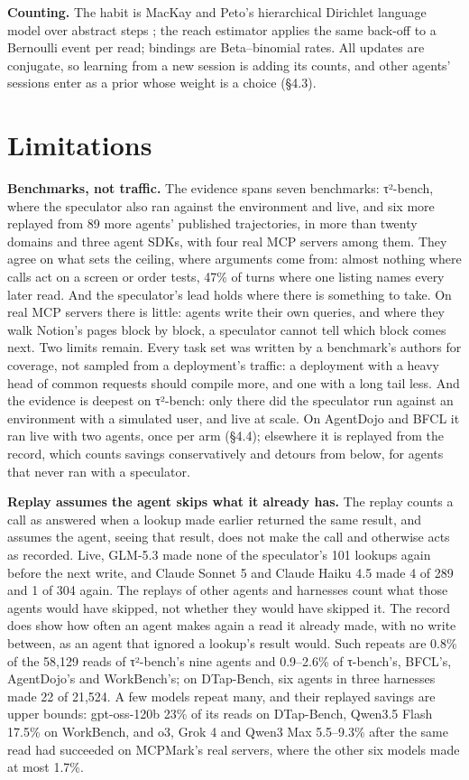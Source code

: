 \documentclass[10pt,twocolumn,letterpaper]{article}
\newcommand{\runin}[1]{{\sffamily\bfseries\color{accent}#1}}
\begin{document}
\runin{Counting.} The habit is MacKay and Peto's hierarchical Dirichlet language model over abstract steps \citep{mackay1995hierarchical}; the reach estimator applies the same back-off to a Bernoulli event per read; bindings are Beta--binomial rates. All updates are conjugate, so learning from a new session is adding its counts, and other agents' sessions enter as a prior whose weight is a choice (§4.3).

\hypertarget{limitations}{%
\section{Limitations}\label{limitations}}

\runin{Benchmarks, not traffic.} The evidence spans seven benchmarks: τ²-bench, where the speculator also ran against the environment and live, and six more replayed from 89 more agents' published trajectories, in more than twenty domains and three agent SDKs, with four real MCP servers among them. They agree on what sets the ceiling, where arguments come from: almost nothing where calls act on a screen or order tests, 47\% of turns where one listing names every later read. And the speculator's lead holds where there is something to take. On real MCP servers there is little: agents write their own queries, and where they walk Notion's pages block by block, a speculator cannot tell which block comes next. Two limits remain. Every task set was written by a benchmark's authors for coverage, not sampled from a deployment's traffic: a deployment with a heavy head of common requests should compile more, and one with a long tail less. And the evidence is deepest on τ²-bench: only there did the speculator run against an environment with a simulated user, and live at scale. On AgentDojo and BFCL it ran live with two agents, once per arm (§4.4); elsewhere it is replayed from the record, which counts savings conservatively and detours from below, for agents that never ran with a speculator.

\runin{Replay assumes the agent skips what it already has.} The replay counts a call as answered when a lookup made earlier returned the same result, and assumes the agent, seeing that result, does not make the call and otherwise acts as recorded. Live, GLM-5.3 made none of the speculator's 101 lookups again before the next write, and Claude Sonnet 5 and Claude Haiku 4.5 made 4 of 289 and 1 of 304 again. The replays of other agents and harnesses count what those agents would have skipped, not whether they would have skipped it. The record does show how often an agent makes again a read it already made, with no write between, as an agent that ignored a lookup's result would. Such repeats are 0.8\% of the 58,129 reads of τ²-bench's nine agents and 0.9--2.6\% of τ-bench's, BFCL's, AgentDojo's and WorkBench's; on DTap-Bench, six agents in three harnesses made 22 of 21,524. A few models repeat many, and their replayed savings are upper bounds: gpt-oss-120b 23\% of its reads on DTap-Bench, Qwen3.5 Flash 17.5\% on WorkBench, and o3, Grok 4 and Qwen3 Max 5.5--9.3\% after the same read had succeeded on MCPMark's real servers, where the other six models made at most 1.7\%.
\end{document}
